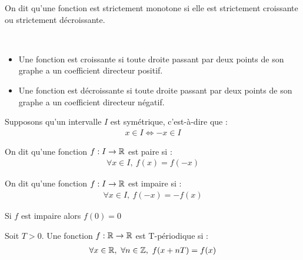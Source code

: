 \begin{graybox}
	\begin{definition}
		On dit qu'une fonction est strictement monotone si elle est strictement croissante ou strictement décroissante.
	\end{definition}
\end{graybox}

\begin{remarque}~
	\begin{itemize}
		\item Une fonction est croissante si toute droite passant par deux points de son graphe a un coefficient directeur positif.
		\item Une fonction est décroissante si toute droite passant par deux points de son graphe a un coefficient directeur négatif.
	\end{itemize}
\end{remarque}

\noindent Supposons qu'un intervalle $I$ est symétrique, c'est-à-dire que :
\begin{align*}
	x \in I \iff -x \in I
\end{align*}

\begin{graybox}
	\begin{definition}
		On dit qu'une fonction $f:I\to \mathbb{R}$ est paire si :
		\begin{align*}
			\forall x \in I,\ f(x) = f(-x)
		\end{align*}
	\end{definition}
\end{graybox}

\begin{graybox}
	\begin{definition}
		On dit qu'une fonction $f:I\to \mathbb{R}$ est impaire si :
		\begin{align*}
			\forall x \in I,\ f(-x) = -f(x)
		\end{align*}
	\end{definition}
\end{graybox}

\begin{remarque}
	Si $f$ est impaire alors $f(0) = 0$
\end{remarque}

\begin{graybox}
	\begin{definition}
		Soit $T > 0$.
		Une fonction $f:\mathbb{R} \to \mathbb{R}$ est T-périodique si :
		\begin{align*}
			\forall x \in \mathbb{R},\ \forall n \in \mathbb{Z},\ f(x + nT) = f(x)
		\end{align*}
	\end{definition}
\end{graybox}

